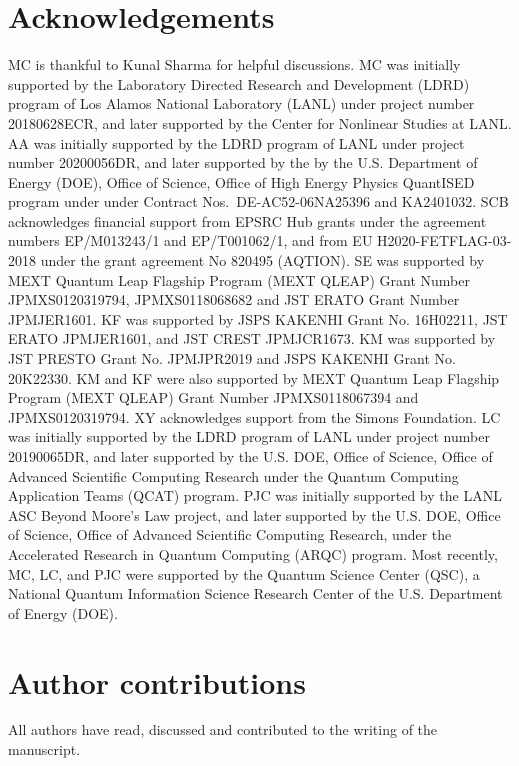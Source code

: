 \documentclass[prx,twocolumn,floatfix,superscriptaddress,longbibliography]{revtex4-1}
\newcommand{\<}{\langle}
\renewcommand{\>}{\rangle}
\begin{document}





\section*{Acknowledgements}

MC is thankful to Kunal Sharma for helpful discussions. MC was initially supported by the Laboratory Directed Research and Development (LDRD) program of
Los Alamos National Laboratory (LANL) under project number 20180628ECR, and later supported by the Center for Nonlinear Studies at LANL. 
AA was initially supported by the LDRD program of
LANL under project number 20200056DR, and later supported by the by the U.S. Department of Energy (DOE), Office of Science, Office of High Energy Physics QuantISED program under under Contract Nos.~DE-AC52-06NA25396 and KA2401032.
SCB acknowledges financial support from EPSRC Hub grants under the agreement numbers EP/M013243/1 and EP/T001062/1, and from EU H2020-FETFLAG-03-2018 under the grant agreement No 820495 (AQTION). 
SE was supported by MEXT Quantum
Leap Flagship Program (MEXT QLEAP) Grant Number
JPMXS0120319794, JPMXS0118068682 and JST ERATO Grant Number JPMJER1601.
KF was supported by JSPS KAKENHI Grant No. 16H02211,  JST ERATO JPMJER1601, and JST CREST JPMJCR1673.
KM was supported by JST PRESTO Grant No. JPMJPR2019 and JSPS KAKENHI Grant No. 20K22330.
KM and KF were also supported by MEXT Quantum Leap Flagship Program (MEXT QLEAP) Grant Number JPMXS0118067394 and JPMXS0120319794. 
XY acknowledges support from the Simons Foundation.
LC was initially supported by the LDRD program of LANL under project number 20190065DR, and later supported by the U.S. DOE, Office of Science, Office of Advanced Scientific Computing Research under the Quantum Computing Application Teams (QCAT) program. 
PJC was initially supported by the LANL ASC Beyond Moore's Law project, and later supported by the U.S. DOE, Office of Science, Office of Advanced Scientific Computing Research, under the Accelerated Research in Quantum Computing (ARQC) program. Most recently, MC, LC, and PJC were supported by the Quantum Science Center (QSC), a National Quantum Information Science Research Center of the U.S. Department of Energy (DOE).

\section*{Author contributions}
All authors have read, discussed and contributed to the writing of the manuscript.
\end{document}
